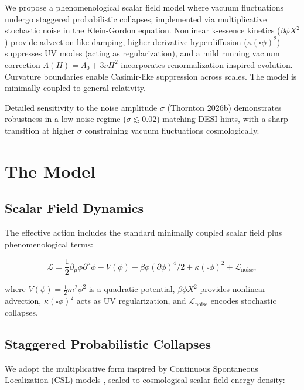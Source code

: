 \documentclass[preprint]{aastex7}
\begin{document}
We propose a phenomenological scalar field model where vacuum fluctuations undergo staggered probabilistic collapses, implemented via multiplicative stochastic noise in the Klein-Gordon equation. Nonlinear k-essence kinetics (\( \beta \phi X^2 \)) provide advection-like damping, higher-derivative hyperdiffusion (\( \kappa (\square \phi)^2 \)) suppresses UV modes (acting as regularization), and a mild running vacuum correction \( \Lambda(H) = \Lambda_0 + 3\nu H^2 \) incorporates renormalization-inspired evolution. Curvature boundaries enable Casimir-like suppression across scales. The model is minimally coupled to general relativity.

Detailed sensitivity to the noise amplitude \( \sigma \) (Thornton 2026b) demonstrates robustness in a low-noise regime (\( \sigma \lesssim 0.02 \)) matching DESI hints, with a sharp transition at higher \( \sigma \) constraining vacuum fluctuations cosmologically.




\section{The Model}

\subsection{Scalar Field Dynamics}

The effective action includes the standard minimally coupled scalar field plus phenomenological terms:

\begin{equation}
\mathcal{L} = \frac{1}{2} \partial_\mu \phi \partial^\mu \phi - V(\phi) - \beta \phi (\partial \phi)^4 / 2 + \kappa (\square \phi)^2 + \mathcal{L}_\text{noise},
\end{equation}

where \( V(\phi) = \frac{1}{2} m^2 \phi^2 \) is a quadratic potential, \( \beta \phi X^2 \) provides nonlinear advection, \( \kappa (\square \phi)^2 \) acts as UV regularization, and \( \mathcal{L}_\text{noise} \) encodes stochastic collapses.

\subsection{Staggered Probabilistic Collapses}

We adopt the multiplicative form inspired by Continuous Spontaneous Localization (CSL) models \citep{Ghirardi1986,Bassi2013}, scaled to cosmological scalar-field energy density:
\end{document}

